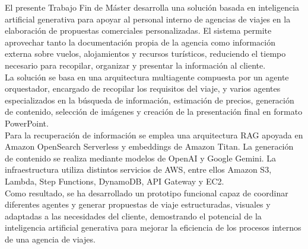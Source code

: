 \thispagestyle{TFMFront}
\begingroup\setlength{\parskip}{0pt}
El presente Trabajo Fin de Máster desarrolla una solución basada en inteligencia artificial generativa para apoyar al personal interno de agencias de viajes en la elaboración de propuestas comerciales personalizadas. El sistema permite aprovechar tanto la documentación propia de la agencia como información externa sobre vuelos, alojamientos y recursos turísticos, reduciendo el tiempo necesario para recopilar, organizar y presentar la información al cliente.
\\

La solución se basa en una arquitectura multiagente compuesta por un agente orquestador, encargado de recopilar los requisitos del viaje, y varios agentes especializados en la búsqueda de información, estimación de precios, generación de contenido, selección de imágenes y creación de la presentación final en formato PowerPoint.
\\

Para la recuperación de información se emplea una arquitectura RAG apoyada en Amazon OpenSearch Serverless y embeddings de Amazon Titan. La generación de contenido se realiza mediante modelos de OpenAI y Google Gemini. La infraestructura utiliza distintos servicios de AWS, entre ellos Amazon S3, Lambda, Step Functions, DynamoDB, API Gateway y EC2.
\\

Como resultado, se ha desarrollado un prototipo funcional capaz de coordinar diferentes agentes y generar propuestas de viaje estructuradas, visuales y adaptadas a las necesidades del cliente, demostrando el potencial de la inteligencia artificial generativa para mejorar la eficiencia de los procesos internos de una agencia de viajes.
\endgroup
\clearpage
